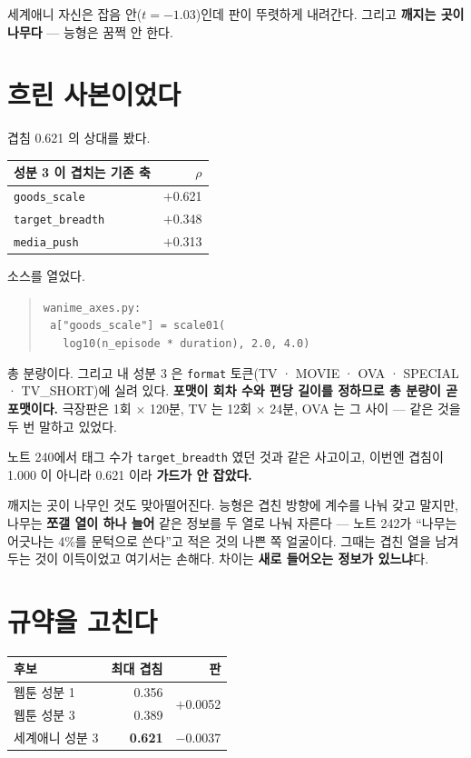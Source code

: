 \documentclass[10pt]{article}
\begin{document}
세계애니 자신은 잡음 안($t{=}-1.03$)인데 판이 뚜렷하게 내려간다. 그리고
\textbf{깨지는 곳이 나무다} --- 능형은 꿈쩍 안 한다.

\section{흐린 사본이었다}

겹침 0.621 의 상대를 봤다.

\begin{center}\small
\begin{tabular}{lr}
\hline
성분 3 이 겹치는 기존 축 & $\rho$ \\
\hline
\texttt{goods\_scale} & $+$0.621 \\
\texttt{target\_breadth} & $+$0.348 \\
\texttt{media\_push} & $+$0.313 \\
\hline
\end{tabular}
\end{center}

소스를 열었다.

\begin{quote}\small
\texttt{wanime\_axes.py:} \\
\texttt{\ a["goods\_scale"] = scale01(} \\
\texttt{\ \ \ log10(n\_episode * duration), 2.0, 4.0)}
\end{quote}

총 분량이다. 그리고 내 성분 3 은 \texttt{format} 토큰(TV · MOVIE · OVA ·
SPECIAL · TV\_SHORT)에 실려 있다. \textbf{포맷이 회차 수와 편당 길이를
정하므로 총 분량이 곧 포맷이다.} 극장판은 1회 $\times$ 120분, TV 는
12회 $\times$ 24분, OVA 는 그 사이 --- 같은 것을 두 번 말하고 있었다.

노트 240에서 태그 수가 \texttt{target\_breadth} 였던 것과 같은 사고이고,
이번엔 겹침이 1.000 이 아니라 0.621 이라 \textbf{가드가 안 잡았다.}

깨지는 곳이 나무인 것도 맞아떨어진다. 능형은 겹친 방향에 계수를 나눠 갖고
말지만, 나무는 \textbf{쪼갤 열이 하나 늘어} 같은 정보를 두 열로 나눠 자른다
--- 노트 242가 ``나무는 어긋나는 4\%를 문턱으로 쓴다''고 적은 것의 나쁜 쪽
얼굴이다. 그때는 겹친 열을 남겨 두는 것이 이득이었고 여기서는 손해다.
차이는 \textbf{새로 들어오는 정보가 있느냐}다.

\section{규약을 고친다}

\begin{center}\small
\begin{tabular}{lrr}
\hline
후보 & 최대 겹침 & 판 \\
\hline
웹툰 성분 1 & 0.356 & \multirow{2}{*}{$+$0.0052} \\
웹툰 성분 3 & 0.389 & \\
세계애니 성분 3 & \textbf{0.621} & $-$0.0037 \\
\hline
\end{tabular}
\end{center}
\end{document}
